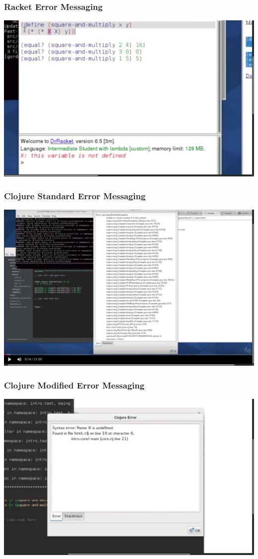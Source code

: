 \documentclass{beamer}
\begin{document}
\begin{frame}
  \frametitle{Racket Error Messaging}
  \includegraphics[scale=.17]{R2Rshot}
\end{frame}

\begin{frame}
  \frametitle{Clojure Standard Error Messaging}
  \includegraphics[scale=.17]{CS20Sshot}
\end{frame}

\begin{frame}
  \frametitle{Clojure Modified Error Messaging}
  \includegraphics[scale=.17]{CM16shot}
\end{frame}
\end{document}
